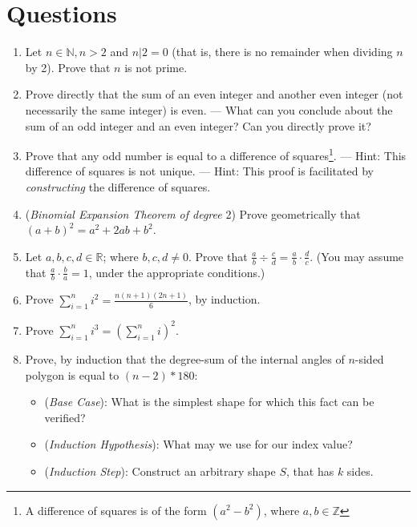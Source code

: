 
	\chapter{Questions}
		\begin{enumerate}
			\item Let $n \in \mathbb{N}, n > 2$ and $n | 2 = 0$ (that is, there is no remainder when dividing $n$ by 2). Prove that $n$ is not prime.
			\item Prove directly that the sum of an even integer and another even integer (not necessarily the same integer) is even.
				\subitem --- What can you conclude about the sum of an odd integer and an even integer? Can you directly prove it?
			\item \challenge Prove that any odd number is equal to a difference of squares\footnote{A difference of squares is of the form $(a^2 - b^2)$, where $a, b \in \mathbb{Z}$}.
				\subitem --- Hint: This difference of squares is not unique.
				\subitem --- Hint: This proof is facilitated by \emph{constructing} the difference of squares.
			\item (\emph{Binomial Expansion Theorem of degree} 2) Prove geometrically that $(a+b)^2 = a^2 + 2ab + b^2$.
			\item Let $a, b, c, d \in \mathbb{R}$; where $b, c, d \neq 0$. Prove that $\frac{a}{b} \div \frac{c}{d} = \frac{a}{b} \cdot \frac{d}{c}$. (You may assume that $\frac{a}{b} \cdot \frac{b}{a} = 1$, under the appropriate conditions.)
			\item Prove $\sum_{i = 1}^{n} i^2 = \frac{n(n+1)(2n+1)}{6}$, by induction.
			\item Prove $\sum_{i = 1}^{n} i^3 = (\sum_{i = 1}^{n} i)^2 $.
			\item \challenge Prove, by induction that the degree-sum of the internal angles of $n$-sided polygon is equal to $(n-2)*180$:
				\begin{itemize}
					\item (\emph{Base Case}): What is the simplest shape for which this fact can be verified?
					\item (\emph{Induction Hypothesis}): What may we use for our index value?
					\item (\emph{Induction Step}): Construct an arbitrary shape $S$, that has $k$ sides.
				\end{itemize}


\end{enumerate}
